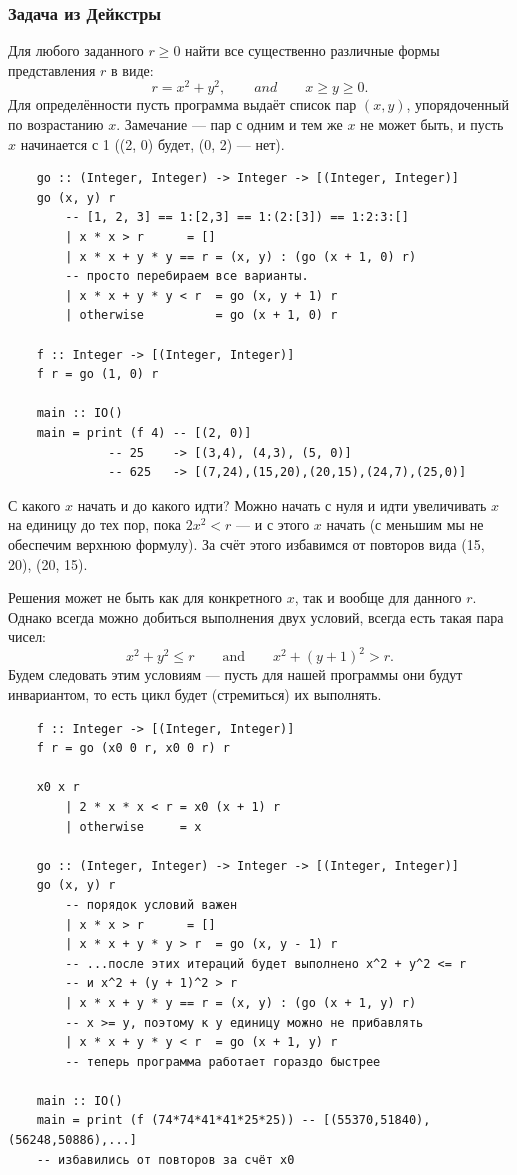 \documentclass{book}
\begin{document}
\subsubsection{Задача из Дейкстры}
Для любого заданного $r \geq 0$ найти все существенно различные формы представления $r$ в виде:
\begin{equation}
    r = x^2 + y^2, \qquad and \qquad x \geq y \geq 0.
\end{equation}
Для определённости пусть программа выдаёт список пар $(x, y)$, упорядоченный по возрастанию $x$.
Замечание --- пар с одним и тем же $x$ не может быть, и пусть $x$ начинается с 1 ((2, 0) будет,
(0, 2) --- нет).
\begin{verbatim}
    go :: (Integer, Integer) -> Integer -> [(Integer, Integer)]
    go (x, y) r
        -- [1, 2, 3] == 1:[2,3] == 1:(2:[3]) == 1:2:3:[]
        | x * x > r      = []
        | x * x + y * y == r = (x, y) : (go (x + 1, 0) r)
        -- просто перебираем все варианты.
        | x * x + y * y < r  = go (x, y + 1) r
        | otherwise          = go (x + 1, 0) r

    f :: Integer -> [(Integer, Integer)]
    f r = go (1, 0) r

    main :: IO()
    main = print (f 4) -- [(2, 0)]
              -- 25    -> [(3,4), (4,3), (5, 0)]
              -- 625   -> [(7,24),(15,20),(20,15),(24,7),(25,0)]
\end{verbatim}

С какого $x$ начать и до какого идти? Можно начать с нуля и идти увеличивать $x$ на единицу до тех
пор, пока $2 x^2 < r$ --- и с этого $x$ начать (с меньшим мы не обеспечим верхнюю формулу). За счёт
этого избавимся от повторов вида (15, 20), (20, 15).

Решения может не быть как для конкретного $x$, так и вообще для данного $r$. Однако всегда можно
добиться выполнения двух условий, всегда есть такая пара чисел:
\begin{equation}
    x^2 + y^2 \leq r \qquad \text{and} \qquad x^2 + (y + 1)^2 > r.
\end{equation}
Будем следовать этим условиям --- пусть для нашей программы они будут инвариантом, то есть цикл
будет (стремиться) их выполнять.
\begin{verbatim}
    f :: Integer -> [(Integer, Integer)]
    f r = go (x0 0 r, x0 0 r) r

    x0 x r
        | 2 * x * x < r = x0 (x + 1) r
        | otherwise     = x

    go :: (Integer, Integer) -> Integer -> [(Integer, Integer)]
    go (x, y) r
        -- порядок условий важен
        | x * x > r      = []
        | x * x + y * y > r  = go (x, y - 1) r
        -- ...после этих итераций будет выполнено x^2 + y^2 <= r
        -- и x^2 + (y + 1)^2 > r
        | x * x + y * y == r = (x, y) : (go (x + 1, y) r)
        -- x >= y, поэтому к y единицу можно не прибавлять
        | x * x + y * y < r  = go (x + 1, y) r
        -- теперь программа работает гораздо быстрее

    main :: IO()
    main = print (f (74*74*41*41*25*25)) -- [(55370,51840),(56248,50886),...]
    -- избавились от повторов за счёт x0
\end{verbatim}
\end{document}
